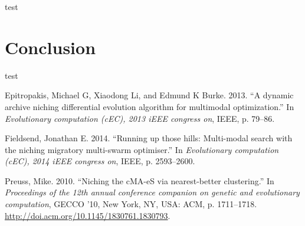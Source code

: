 \documentclass[12pt,a4paper]{article}
\begin{document}
test

\section{Conclusion}\label{conclusion}

test \newpage

\hypertarget{refs}{}
\hypertarget{ref-epitropakisux5f2013}{}
Epitropakis, Michael G, Xiaodong Li, and Edmund K Burke. 2013. ``A
dynamic archive niching differential evolution algorithm for multimodal
optimization.'' In \emph{Evolutionary computation (cEC), 2013 iEEE
congress on}, IEEE, p. 79--86.

\hypertarget{ref-fieldsendux5f2014}{}
Fieldsend, Jonathan E. 2014. ``Running up those hills: Multi-modal
search with the niching migratory multi-swarm optimiser.'' In
\emph{Evolutionary computation (cEC), 2014 iEEE congress on}, IEEE, p.
2593--2600.

\hypertarget{ref-preussux5f2010}{}
Preuss, Mike. 2010. ``Niching the cMA-eS via nearest-better
clustering.'' In \emph{Proceedings of the 12th annual conference
companion on genetic and evolutionary computation}, GECCO '10, New York,
NY, USA: ACM, p. 1711--1718.
\url{http://doi.acm.org/10.1145/1830761.1830793}.
\end{document}
